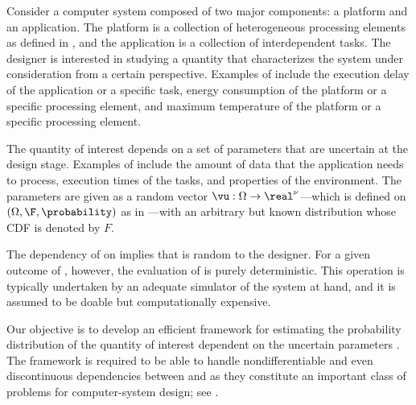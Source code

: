 Consider a computer system composed of two major components: a platform and an
application. The platform is a collection of heterogeneous processing elements
as defined in , and the application is a collection of
interdependent tasks. The designer is interested in studying a quantity \g that
characterizes the system under consideration from a certain perspective.
Examples of \g include the execution delay of the application or a specific
task, energy consumption of the platform or a specific processing element, and
maximum temperature of the platform or a specific processing element.

The quantity of interest \g depends on a set of parameters \vu that are
uncertain at the design stage. Examples of \vu include the amount of data that
the application needs to process, execution times of the tasks, and properties
of the environment. The parameters \vu are given as a random vector $\vu: \Omega
\to \real^\nu$---which is defined on $(\Omega, \F, \probability)$ as in
---with an arbitrary but known distribution whose
\ac{CDF} is denoted by $F$.

The dependency of \g on \vu implies that \g is random to the designer. For a
given outcome of \vu, however, the evaluation of \g is purely deterministic.
This operation is typically undertaken by an adequate simulator of the system at
hand, and it is assumed to be doable but computationally expensive.

Our objective is to develop an efficient framework for estimating the
probability distribution of the quantity of interest \g dependent on the
uncertain parameters \vu. The framework is required to be able to handle
nondifferentiable and even discontinuous dependencies between \g and \vu as they
constitute an important class of problems for computer-system design; see
.
